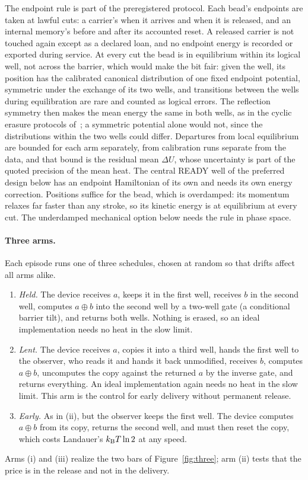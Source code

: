 The endpoint rule is part of the preregistered protocol. Each bead's endpoints are taken at lawful cuts: a carrier's when it arrives and when it is released, and an internal memory's before and after its accounted reset. A released carrier is not touched again except as a declared loan, and no endpoint energy is recorded or exported during service. At every cut the bead is in equilibrium within its logical well, not across the barrier, which would make the bit fair: given the well, its position has the calibrated canonical distribution of one fixed endpoint potential, symmetric under the exchange of its two wells, and transitions between the wells during equilibration are rare and counted as logical errors. The reflection symmetry then makes the mean energy the same in both wells, as in the cyclic erasure protocols of~\cite{Gavrilov17}; a symmetric potential alone would not, since the distributions within the two wells could differ. Departures from local equilibrium are bounded for each arm separately, from calibration runs separate from the data, and that bound is the residual mean $\Delta U$, whose uncertainty is part of the quoted precision of the mean heat. The central READY well of the preferred design below has an endpoint Hamiltonian of its own and needs its own energy correction. Positions suffice for the bead, which is overdamped: its momentum relaxes far faster than any stroke, so its kinetic energy is at equilibrium at every cut. The underdamped mechanical option below needs the rule in phase space.

\paragraph{Three arms.} Each episode runs one of three schedules, chosen at random so that drifts affect all arms alike.
\begin{enumerate}[label=(\roman*),leftmargin=*]
\item \emph{Held.} The device receives $a$, keeps it in the first well, receives $b$ in the second well, computes $a\oplus b$ into the second well by a two-well gate (a conditional barrier tilt), and returns both wells. Nothing is erased, so an ideal implementation needs no heat in the slow limit.
\item \emph{Lent.} The device receives $a$, copies it into a third well, hands the first well to the observer, who reads it and hands it back unmodified, receives $b$, computes $a\oplus b$, uncomputes the copy against the returned $a$ by the inverse gate, and returns everything. An ideal implementation again needs no heat in the slow limit. This arm is the control for early delivery without permanent release.
\item \emph{Early.} As in (ii), but the observer keeps the first well. The device computes $a\oplus b$ from its copy, returns the second well, and must then reset the copy, which costs Landauer's $k_{\mathrm B} T\ln2$ at any speed.
\end{enumerate}
Arms (i) and (iii) realize the two bars of Figure~\ref{fig:three}; arm (ii) tests that the price is in the release and not in the delivery.

